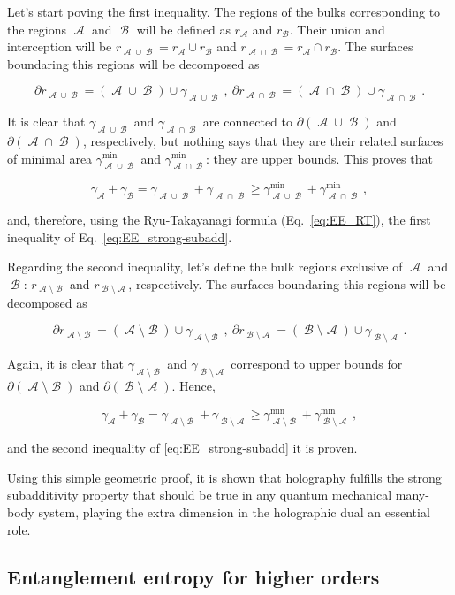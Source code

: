 \documentclass[twocolumn]{revtex4}
\providecommand{\eq}[2]{
    \begin{equation}
        #2
    \label{eq:#1}
    \end{equation}
}
\DeclareMathOperator{\calA}{\mathcal{A}}
\DeclareMathOperator{\calB}{\mathcal{B}}
\begin{document}
Let's start poving the first inequality. The regions of the bulks corresponding to the regions $\calA$ and $\calB$ will be defined as $r_{\calA}$ and $r_{\calB}$. Their union and interception will be $r_{\calA \cup \calB} = r_{\calA} \cup r_{\calB}$ and $r_{\calA \cap \calB} = r_{\calA} \cap r_{\calB}$. The surfaces boundaring this regions will be decomposed as
\eq{SS_dr-1}{
    \partial r_{\calA \cup \calB} = (\calA \cup \calB) \cup \gamma_{\calA \cup \calB} \ , \ \partial r_{\calA \cap \calB } = (\calA \cap \calB) \cup \gamma_{\calA \cap \calB} \ .
}
It is clear that $\gamma_{\calA \cup \calB}$ and $\gamma_{\calA \cap \calB}$ are connected to $\partial (\calA \cup \calB)$ and $\partial (\calA \cap \calB)$, respectively, but nothing says that they are their related surfaces of minimal area $\gamma^{\text{min}}_{\calA \cup \calB}$ and $\gamma^{\text{min}}_{\calA \cap \calB}$: they are upper bounds. This proves that
\eq{SS_gamma-1}{
    \gamma_{\calA} + \gamma_{\calB} = \gamma_{\calA \cup \calB} + \gamma_{\calA \cap \calB} \ge \gamma^{\text{min}}_{\calA \cup \calB} + \gamma^{\text{min}}_{\calA \cap \calB} \ ,
}
and, therefore, using the Ryu-Takayanagi formula (Eq.~\ref{eq:EE_RT}), the first inequality of Eq.~\ref{eq:EE_strong-subadd}.

Regarding the second inequality, let's define the bulk regions exclusive of $\calA$ and $\calB$: $r_{\calA \setminus \calB}$ and $r_{\calB \setminus \calA}$, respectively. The surfaces boundaring this regions will be decomposed as
\eq{SS_dr-2}{
    \partial r_{\calA \setminus \calB} = (\calA \setminus \calB) \cup \gamma_{\calA \setminus \calB} \ , \ \partial r_{\calB \setminus \calA } = (\calB \setminus \calA) \cup \gamma_{\calB \setminus \calA} \ .
}
Again, it is clear that $\gamma_{\calA \setminus \calB}$ and $\gamma_{\calB \setminus \calA}$ correspond to upper bounds for $\partial (\calA \setminus \calB)$ and $\partial (\calB \setminus \calA)$. Hence,
\eq{SS_gamma-2}{
    \gamma_{\calA} + \gamma_{\calB} = \gamma_{\calA \setminus \calB} + \gamma_{\calB \setminus \calA} \ge \gamma^{\text{min}}_{\calA \setminus \calB} + \gamma^{\text{min}}_{\calB \setminus \calA} \ ,
}
and the second inequality of \ref{eq:EE_strong-subadd} it is proven.

Using this simple geometric proof, it is shown that holography fulfills the strong subadditivity property that should be true in any quantum mechanical many-body system, playing the extra dimension in the holographic dual an essential role.


\subsection{Entanglement entropy for higher orders} \label{s:EE_HO}
\end{document}
